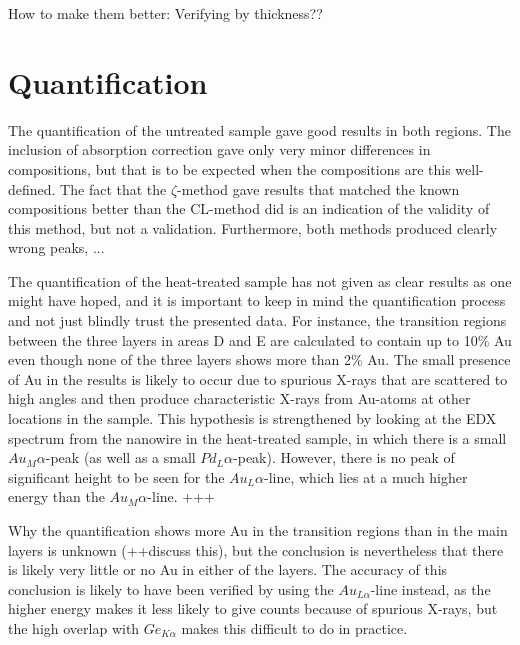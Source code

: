 How to make them better:
Verifying by thickness??

\section{Quantification}

The quantification of the untreated sample gave good results in both regions. The inclusion of absorption correction gave only very minor differences in compositions, but that is to be expected when the compositions are this well-defined. The fact that the $\zeta$-method gave results that matched the known compositions better than the CL-method did is an indication of the validity of this method, but not a validation. Furthermore, both methods produced clearly wrong peaks, ...


The quantification of the heat-treated sample has not given as clear results as one might have hoped, and it is important to keep in mind the quantification process and not just blindly trust the presented data. For instance, the transition regions between the three layers in areas D and E are calculated to contain up to 10\% Au even though none of the three layers shows more than 2\% Au. The small presence of Au in the results is likely to occur due to spurious X-rays that are scattered to high angles and then produce characteristic X-rays from Au-atoms at other locations in the sample. This hypothesis is strengthened by looking at the EDX spectrum from the nanowire in the heat-treated sample, in which there is a small $Au_M\alpha$-peak (as well as a small $Pd_L\alpha$-peak). However, there is no peak of significant height to be seen for the $Au_L\alpha$-line, which lies at a much higher energy than the $Au_M\alpha$-line. +++

Why the quantification shows more Au in the transition regions than in the main layers is unknown (++discuss this), but the conclusion is nevertheless that there is likely very little or no Au in either of the layers. The accuracy of this conclusion is likely to have been verified by using the $Au_{L\alpha}$-line instead, as the higher energy makes it less likely to give counts because of spurious X-rays, but the high overlap with $Ge_{K\alpha}$ makes this difficult to do in practice.

